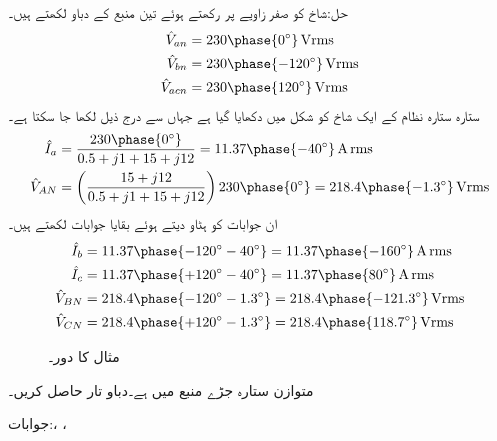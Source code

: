 حل:شاخ  کو صفر زاویے پر رکھتے ہوئے  تین منبع کے دباو لکھتے ہیں۔
\begin{align*}
\hat{V}_{an}&=230\phase{0^{\circ}}\,\si{\volt\rms}\\
\hat{V}_{bn}&=230\phase{-120^{\circ}}\,\si{\volt\rms}\\
\hat{V}_{acn}&=230\phase{120^{\circ}}\,\si{\volt\rms}
\end{align*}
ستارہ ستارہ نظام کے ایک شاخ کو شکل  میں دکھایا گیا ہے جہاں سے درج ذیل لکھا جا سکتا ہے۔
\begin{align*}
\hat{I}_a&=\frac{230\phase{0^{\circ}}}{0.5+j1+15+j12}=11.37\phase{-40^{\circ}}\,\si{\ampere}\,\rms\\
\hat{V}_{AN}&=\left(\frac{15+j12}{0.5+j1+15+j12}\right) 230\phase{0^{\circ}}=218.4\phase{-1.3^{\circ}}\,\si{\volt\rms}
\end{align*}
ان جوابات کو  ہٹاو دیتے ہوئے بقایا جوابات لکھتے ہیں۔
\begin{align*}
\hat{I}_b&=11.37\phase{-120^{\circ}-40^{\circ}}=11.37\phase{-160^{\circ}}\,\si{\ampere}\,\rms\\
\hat{I}_c&=11.37\phase{+120^{\circ}-40^{\circ}}=11.37\phase{80^{\circ}}\,\si{\ampere}\,\rms\\
\hat{V}_{BN}&=218.4\phase{-120^{\circ}-1.3^{\circ}}=218.4\phase{-121.3^{\circ}}\,\si{\volt\rms}\\
\hat{V}_{CN}&=218.4\phase{+120^{\circ}-1.3^{\circ}}=218.4\phase{118.7^{\circ}}\,\si{\volt\rms}
\end{align*} 
%
\begin{figure}
\centering
{}
\caption{مثال  کا دور۔}
\label{شکل_تین_دوری_ستارہ_ستارہ_بوجھ_رکاوٹ_الف}
\end{figure}
متوازن  ستارہ جڑے منبع میں  ہے۔دباو تار حاصل کریں۔

جوابات:، ، 

